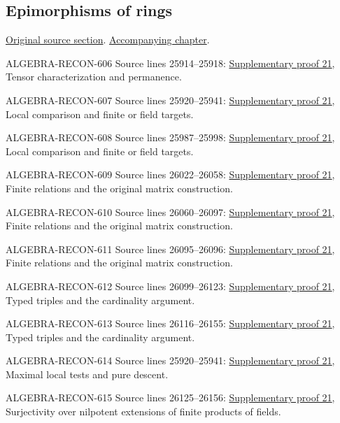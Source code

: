 \subsection{Epimorphisms of rings}
\hypertarget{algebra-source-section-epimorphism}{}
\noindent\href{https://github.com/stacks/stacks-project/blob/a04446e57ec1fbc252a871afcec7752fb2807b14/algebra.tex\#L25862}{Original source section}. \href{algebra.pdf\#nameddest=section-epimorphism}{Accompanying chapter}.

\begin{AlgebraSourceRoutes}
\item[ALGEBRA-RECON-606] Source lines 25914--25918: \hyperlink{algebra_epimorphism_notes_20260928}{Supplementary proof 21}, Tensor characterization and permanence.
\item[ALGEBRA-RECON-607] Source lines 25920--25941: \hyperlink{algebra_epimorphism_notes_20260928}{Supplementary proof 21}, Local comparison and finite or field targets.
\item[ALGEBRA-RECON-608] Source lines 25987--25998: \hyperlink{algebra_epimorphism_notes_20260928}{Supplementary proof 21}, Local comparison and finite or field targets.
\item[ALGEBRA-RECON-609] Source lines 26022--26058: \hyperlink{algebra_epimorphism_notes_20260928}{Supplementary proof 21}, Finite relations and the original matrix construction.
\item[ALGEBRA-RECON-610] Source lines 26060--26097: \hyperlink{algebra_epimorphism_notes_20260928}{Supplementary proof 21}, Finite relations and the original matrix construction.
\item[ALGEBRA-RECON-611] Source lines 26095--26096: \hyperlink{algebra_epimorphism_notes_20260928}{Supplementary proof 21}, Finite relations and the original matrix construction.
\item[ALGEBRA-RECON-612] Source lines 26099--26123: \hyperlink{algebra_epimorphism_notes_20260928}{Supplementary proof 21}, Typed triples and the cardinality argument.
\item[ALGEBRA-RECON-613] Source lines 26116--26155: \hyperlink{algebra_epimorphism_notes_20260928}{Supplementary proof 21}, Typed triples and the cardinality argument.
\item[ALGEBRA-RECON-614] Source lines 25920--25941: \hyperlink{algebra_epimorphism_notes_20260928}{Supplementary proof 21}, Maximal local tests and pure descent.
\item[ALGEBRA-RECON-615] Source lines 26125--26156: \hyperlink{algebra_epimorphism_notes_20260928}{Supplementary proof 21}, Surjectivity over nilpotent extensions of finite products of fields.
\end{AlgebraSourceRoutes}

